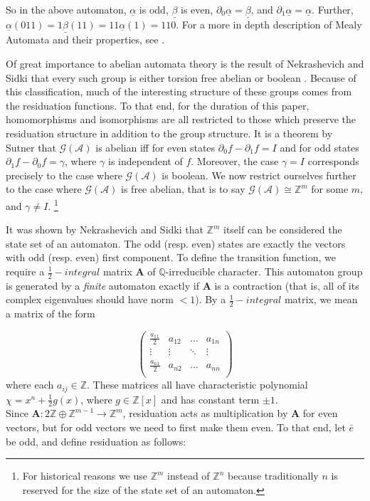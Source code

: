 \documentclass[runningheads]{llncs}
\newcommand{\A}{\mathcal{A}}
\newcommand{\G}{\mathcal{G}}
\newcommand{\Z}{\mathbb{Z}}
\newcommand{\Q}{\mathbb{Q}}
\newcommand{\2}{\textbf{2}}
\newcommand{\Am}{\textbf{A}}
\newcommand{\del}{\partial}
\newcommand{\e}{\bar{e}}
\begin{document}
So in the above automaton, $\underline{\alpha}$ is odd, $\underline{\beta}$ 
is even, $\del_0 \underline{\alpha} = \underline{\beta}$, 
and $\del_1 \underline{\alpha} = \underline{\alpha}$.
Further,
$\underline{\alpha}(011) = 1\underline{\beta}(11) = 11\underline{\alpha}(1) = 110$.
For a more in depth description of Mealy Automata and their properties, 
see \cite{Sakarovitch09:automata_theory,Holcombe}.

Of great importance to abelian automata theory is the result of 
Nekrashevich and Sidki that every such group is either torsion free abelian or 
boolean \cite{NekrashevychSidki04:automorphisms}. Because of this classification, 
much of the interesting structure of these groups comes from the residuation
functions. To that end, for the duration of this paper, 
homomorphisms and isomorphisms are all restricted to those 
which preserve the residuation structure in addition to the group structure.
It is a theorem by Sutner \cite{Sutner18:abelian_automata} 
that $\G(\A)$ is abelian iff for even states $\del_0 f - \del_1 f = I$ 
and for odd states $\del_1 f - \del_0 f = \gamma$, where $\gamma$ is 
independent of $f$. Moreover, the case $\gamma = I$ corresponds 
precisely to the case where $\G(\A)$ is boolean.
We now restrict ourselves further to the case where $\G(\A)$ is 
free abelian, that is to say $\G(\A) \cong \Z^m$ for some $m$,
and $\gamma \not = I$.%
\footnote%
{%
  For historical reasons we use $\Z^m$ instead of $\Z^n$ because 
  traditionally $n$ is reserved for the size of the state set of 
  an automaton.
}

It was shown by Nekrashevich and Sidki \cite{NekrashevychSidki04:automorphisms} 
that $\Z^m$ itself can be considered the state set of an automaton.
The odd (resp. even) states are exactly the vectors with odd (resp. even) 
first component. To define the transition function, we require a 
$\frac{1}{2}-integral$ matrix $\Am$ of $\Q$-irreducible character. 
This automaton group is generated by a \emph{finite} automaton exactly if 
$\Am$ is a contraction (that is, all of its complex eigenvalues 
should have norm $<1$). By a $\frac{1}{2}-integral$ matrix, we mean a matrix 
of the form

\[
\begin{pmatrix}
  \frac{a_{11}}{2} & a_{12} & \dots  & a_{1n}\\
  \vdots           & \vdots & \ddots & \vdots\\
  \frac{a_{n1}}{2} & a_{n2} & \dots  & a_{nn}\\
\end{pmatrix}
\]
where each $a_{ij} \in \Z$. These matrices all have characteristic polynomial\\
$\chi = x^n + \frac{1}{2}g(x)$, where $g \in \Z[x]$ and has constant term 
$\pm 1$.\\ 
Since $\Am : 2\Z \oplus \Z^{m-1} \to \Z^m$,
residuation acts as multiplication by $\Am$ for even vectors,
but for odd vectors we need to first make them even. To that end, let $\e$
be odd, and define residuation as follows:
\end{document}
